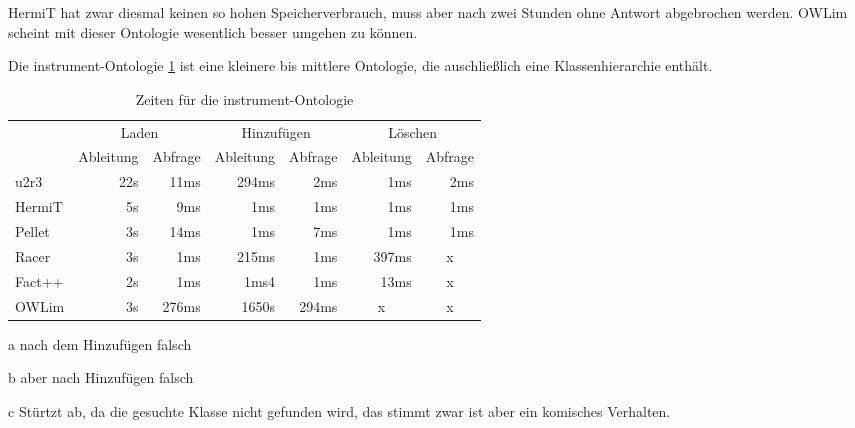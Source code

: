 HermiT hat zwar diesmal keinen so hohen Speicherverbrauch, muss aber nach zwei Stunden ohne Antwort abgebrochen werden. OWLim scheint mit dieser Ontologie wesentlich besser umgehen zu können.

Die instrument-Ontologie \ref{table-time-instrument} ist eine kleinere bis mittlere Ontologie, die auschließlich eine Klassenhierarchie enthält.

\begin{table}[htbp]
\caption{Zeiten für die instrument-Ontologie}
\label{table-time-instrument}
\begin{center}
\begin{threeparttable}
\begin{tabular}{l|r|r|r|r|r|r|}
\cline{2-7}
 & \multicolumn{2}{|c|}{Laden} & \multicolumn{2}{|c|}{Hinzufügen} & \multicolumn{2}{|c|}{Löschen} \\
\cline{2-7}
 & \multicolumn{1}{|c|}{Ableitung} & \multicolumn{1}{|c|}{Abfrage} & \multicolumn{1}{|c|}{Ableitung} & \multicolumn{1}{|c|}{Abfrage} & \multicolumn{1}{|c|}{Ableitung} & \multicolumn{1}{|c|}{Abfrage} \\
\hline
\multicolumn{1}{|l|}{u2r3} & 22s & 11ms & 294ms & 2ms & 1ms & 2ms \\ \hline
\multicolumn{1}{|l|}{HermiT\tnote{a}} & 5s & 9ms & 1ms & 1ms & 1ms & 1ms \\ \hline
\multicolumn{1}{|l|}{Pellet\tnote{b}} & 3s & 14ms & 1ms & 7ms & 1ms & 1ms \\ \hline
\multicolumn{1}{|l|}{Racer\tnote{c}} & 3s & 1ms & 215ms & 1ms & 397ms & \multicolumn{1}{c|}{x} \\ \hline
\multicolumn{1}{|l|}{Fact++\tnote{c}} & 2s & 1ms & 1ms4 & 1ms & 13ms & \multicolumn{1}{c|}{x} \\ \hline
\multicolumn{1}{|l|}{OWLim} & 3s & 276ms & 1650s & 294ms & \multicolumn{1}{c|}{x} & \multicolumn{1}{c|}{x} \\ \hline
\end{tabular}
\begin{tablenotes}
	\item[a] nach dem Hinzufügen falsch
	\item[b] aber nach Hinzufügen falsch
	\item[c] Stürtzt ab, da die gesuchte Klasse nicht gefunden wird, das stimmt zwar ist aber ein komisches Verhalten.
\end{tablenotes}
\end{threeparttable}
\end{center}
\end{table}

